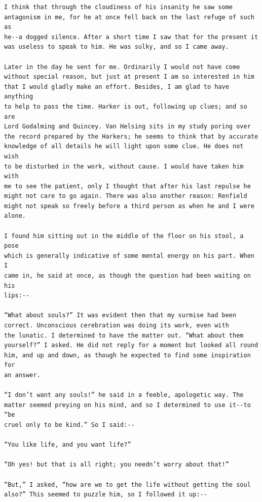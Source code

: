 \documentclass{article}
\begin{document}
\begin{verbatim}
I think that through the cloudiness of his insanity he saw some
antagonism in me, for he at once fell back on the last refuge of such as
he--a dogged silence. After a short time I saw that for the present it
was useless to speak to him. He was sulky, and so I came away.

Later in the day he sent for me. Ordinarily I would not have come
without special reason, but just at present I am so interested in him
that I would gladly make an effort. Besides, I am glad to have anything
to help to pass the time. Harker is out, following up clues; and so are
Lord Godalming and Quincey. Van Helsing sits in my study poring over
the record prepared by the Harkers; he seems to think that by accurate
knowledge of all details he will light upon some clue. He does not wish
to be disturbed in the work, without cause. I would have taken him with
me to see the patient, only I thought that after his last repulse he
might not care to go again. There was also another reason: Renfield
might not speak so freely before a third person as when he and I were
alone.

I found him sitting out in the middle of the floor on his stool, a pose
which is generally indicative of some mental energy on his part. When I
came in, he said at once, as though the question had been waiting on his
lips:--

“What about souls?” It was evident then that my surmise had been
correct. Unconscious cerebration was doing its work, even with
the lunatic. I determined to have the matter out. “What about them
yourself?” I asked. He did not reply for a moment but looked all round
him, and up and down, as though he expected to find some inspiration for
an answer.

“I don’t want any souls!” he said in a feeble, apologetic way. The
matter seemed preying on his mind, and so I determined to use it--to “be
cruel only to be kind.” So I said:--

“You like life, and you want life?”

“Oh yes! but that is all right; you needn’t worry about that!”

“But,” I asked, “how are we to get the life without getting the soul
also?” This seemed to puzzle him, so I followed it up:--


\end{verbatim}
\end{document}
